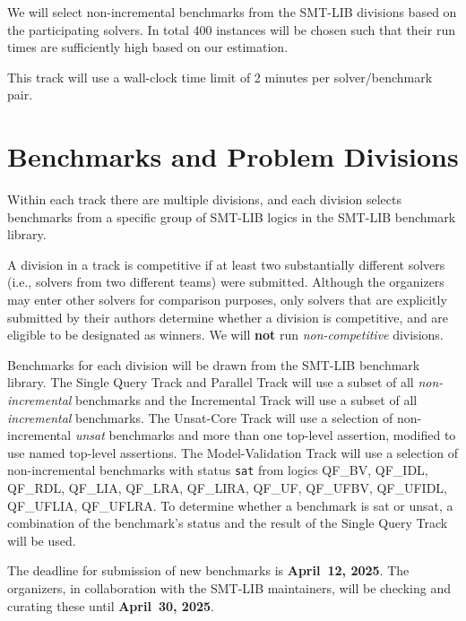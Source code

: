 \documentclass[12pt]{article}
\newcommand{\maintrack}{Single Query Track\xspace}
\newcommand{\inctrack}{Incremental Track\xspace}
\newcommand{\ucoretrack}{Unsat-Core Track\xspace}
\newcommand{\mvaltrack}{Model-Validation Track\xspace}
\newcommand{\challtrack}{Industry-Challenge Track\xspace}
\newcommand{\paralleltrack}{Parallel Track\xspace}
\begin{document}
We will select non-incremental benchmarks from the SMT-LIB divisions
based on the participating solvers.  In total 400 instances will be
chosen such that their run times are sufficiently high based on our
estimation.

This track will use a wall-clock time limit of 2 minutes per
solver/benchmark pair.

\section{Benchmarks and Problem Divisions}

%
Within each track there are multiple divisions, and each division selects
benchmarks from a specific group of SMT-LIB logics in the SMT-LIB benchmark
library.

A division in a track is competitive if at least two substantially
different solvers (i.e., solvers from two different teams) were
submitted.  Although the organizers may enter other solvers for
comparison purposes, only solvers that are explicitly submitted by
their authors determine whether a division is competitive, and are
eligible to be designated as winners.
We will \textbf{not} run \emph{non-competitive} divisions.

Benchmarks for each division will be drawn from the SMT-LIB benchmark
library.  The \maintrack and \paralleltrack{} will use a
subset of all \emph{non-incremental} benchmarks and the \inctrack will
use a subset of all \emph{incremental} benchmarks.
%
%
The \ucoretrack will use a selection of non-incremental
\emph{unsat} benchmarks
and more than one top-level assertion, modified to use named
top-level assertions.  The \mvaltrack will use a selection of non-incremental
benchmarks with status \texttt{sat} from logics QF\_BV, QF\_IDL, QF\_RDL,
QF\_LIA, QF\_LRA, QF\_LIRA, QF\_UF, QF\_UFBV, QF\_UFIDL, QF\_UFLIA, QF\_UFLRA.
To determine whether a benchmark is sat or unsat, a combination of
the benchmark's status and the result of the \maintrack{} will be used.


The deadline for submission of new benchmarks is {\bf April~12, 2025}.
%
The organizers, in collaboration with the SMT-LIB maintainers, will be
checking and curating these until {\bf April~30, 2025}.
\end{document}
